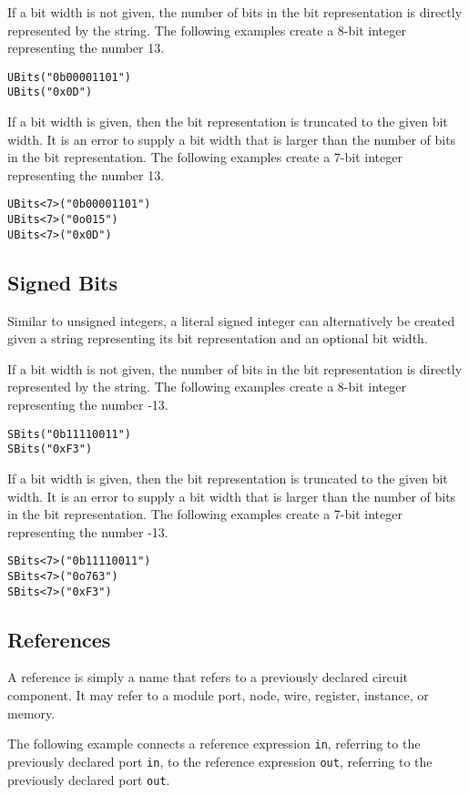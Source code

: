 \documentclass[12pt]{article}
\begin{document}
If a bit width is not given, the number of bits in the bit representation is directly represented by the string. The following examples create a 8-bit integer representing the number 13.
\begin{verbatim}
UBits("0b00001101")
UBits("0x0D")
\end{verbatim}

If a bit width is given, then the bit representation is truncated to the given bit width. It is an error to supply a bit width that is larger than the number of bits in the bit representation. The following examples create a 7-bit integer representing the number 13.
\begin{verbatim}
UBits<7>("0b00001101")
UBits<7>("0o015")
UBits<7>("0x0D")
\end{verbatim}

\subsection{Signed Bits}

Similar to unsigned integers, a literal signed integer can alternatively be created given a string representing its bit representation and an optional bit width. 

If a bit width is not given, the number of bits in the bit representation is directly represented by the string. The following examples create a 8-bit integer representing the number -13.
\begin{verbatim}
SBits("0b11110011")
SBits("0xF3")
\end{verbatim}

If a bit width is given, then the bit representation is truncated to the given bit width. It is an error to supply a bit width that is larger than the number of bits in the bit representation. The following examples create a 7-bit integer representing the number -13.
\begin{verbatim}
SBits<7>("0b11110011")
SBits<7>("0o763")
SBits<7>("0xF3")
\end{verbatim}

\subsection{References}
A reference is simply a name that refers to a previously declared circuit component. It may refer to a module port, node, wire, register, instance, or memory.

The following example connects a reference expression \verb|in|, referring to the previously declared port \verb|in|, to the reference expression \verb|out|, referring to the previously declared port \verb|out|.
\end{document}
